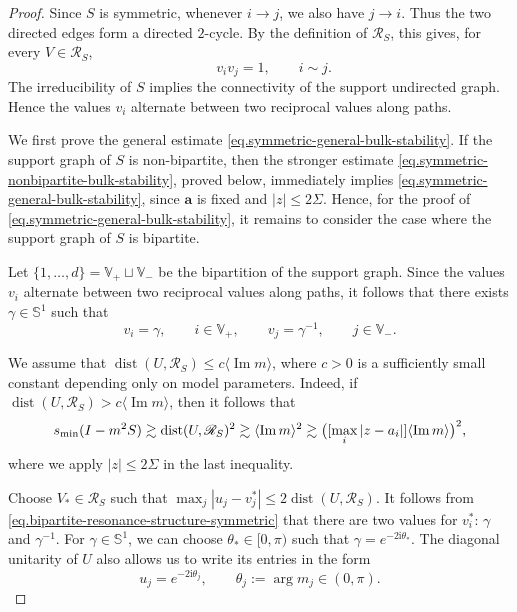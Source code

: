 \documentclass[11pt,twoside, a4paper]{article}
\numberwithin{equation}{section}
\numberwithin{figure}{section}
\theoremstyle{plain} %
\theoremstyle{definition}
\theoremstyle{remark}
\newcommand{\1} {\mspace{1 mu}}
\newcommand{\2} {\mspace{2 mu}}
\DeclareMathOperator{\im}{Im}
\DeclareMathOperator{\dist}{dist}
\begin{document}
\begin{proof}
        Since \(S\) is symmetric, whenever \(i\to j\), we also have \(j\to i\).
        Thus the two directed edges form a directed \(2\)-cycle. By the definition of \(\mathscr R_S\), this gives, for every $V\in\mathscr{R}_S$, 
        \begin{equation}\label{eq.symmetry-vivj}
            \qquad v_iv_j=1,\qquad i\sim j.
        \end{equation}
        The irreducibility of $S$ implies the connectivity of the support undirected graph. Hence the values
        \(v_i\) alternate between two reciprocal values along paths.

        

    We first prove the general estimate \eqref{eq.symmetric-general-bulk-stability}.
    If the support graph of \(S\) is non-bipartite, then the stronger estimate
    \eqref{eq.symmetric-nonbipartite-bulk-stability}, proved below, immediately
    implies \eqref{eq.symmetric-general-bulk-stability}, since \(\mathbf a\) is fixed and
    \(|z|\le2\Sigma\). Hence, for the proof of
    \eqref{eq.symmetric-general-bulk-stability}, it remains to consider the case
    where the support graph of \(S\) is bipartite.

    Let
    $
        \{1,\dots,d\}=\mathbb V_+\sqcup\mathbb V_-
    $
    be the bipartition of the support graph. 
    Since the values \(v_i\) alternate between two reciprocal values along paths, it follows that there exists
    \(\gamma\in\mathbb S^1\) such that
    \begin{equation}\label{eq.bipartite-resonance-structure-symmetric}
        v_i=\gamma,\qquad i\in\mathbb V_+,
        \qquad
        v_j=\gamma^{-1},\qquad j\in\mathbb V_- .
    \end{equation}

   
        

    We assume that $\dist(U,\mathscr{R}_{S})\le c\langle\im m\rangle$, 
    where \(c>0\) is a sufficiently small constant depending only on model parameters. Indeed, if
    \(\dist(U,\mathscr{R}_{S})>c\langle\im m\rangle\), then it follows that
    \[
        s_{\rm min}(I-m^2S)
        \gtrsim
        \dist(U,\mathscr{R}_{S})^2
        \gtrsim
        \langle\im m\rangle^2
        \gtrsim
        \bigl(
            [\max_i|z-a_i|]\langle\im m\rangle
        \bigr)^2,
    \]
    where we apply $|z|\le 2\Sigma$ in the last inequality.
    
    Choose \(V_*\in\mathscr R_{S}\) such that
    $
       \max_j |u_j-v^*_j|\le 2\dist(U,\mathscr{R}_{S}) .
    $
    It follows from \eqref{eq.bipartite-resonance-structure-symmetric} that there are two values for $v^*_i$: $\gamma$ and $\gamma^{-1}$. For \(\gamma\in\mathbb S^1\), we can choose \(\theta_*\in[0,\pi)\) such that
    $
        \gamma=e^{-2\mathrm i\theta_*}.
    $
    The diagonal unitarity of \(U\) also allows us to write its entries in the form
    \[
        u_j=e^{-2\mathrm i\theta_j},
        \qquad 
        \theta_j:=\arg m_j\in(0,\pi).
    \]
    

\end{proof}
\end{document}
